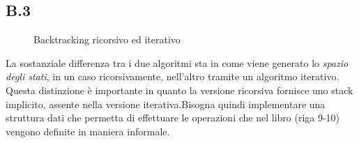 \documentclass[a4paper]{article}
\begin{document}
\subsection{B.3}
\begin{figure}[!ht]
\centering
{}
\caption{Backtracking ricorsivo ed iterativo} \label{FIG:B3_algorithms}
\end{figure}
La sostanziale differenza tra i due algoritmi sta in come viene generato lo \textit{spazio degli stati}, in un caso ricorsivamente, nell'altro tramite un algoritmo iterativo.\\
Questa distinzione è importante in quanto la versione ricorsiva fornisce uno stack implicito, assente nella versione iterativa.Bisogna quindi implementare una struttura dati che permetta di effettuare le operazioni che nel libro (riga 9-10) vengono definite in maniera informale.
\end{document}
